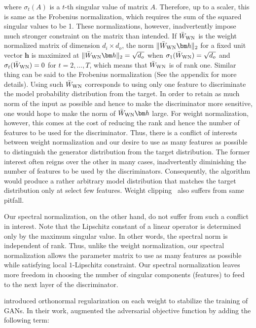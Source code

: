 where $\sigma_t(A)$ is a $t$-th singular value of matrix $A$. Therefore, up to a scaler, this is same as the Frobenius normalization, which requires the sum of the squared singular values to be 1. These normalizations, however, inadvertently impose much stronger constraint on the matrix than intended. If $\bar{W}_{\rm WN}$ is the weight normalized matrix of dimension $d_i \times d_o$, the norm $\|\bar{W}_{\rm WN}{\bm h}\|_2$ for a fixed unit vector ${\bm h}$ is maximized at $\| \bar{W}_{\rm WN} {\bm h} \|_2 =\sqrt{d_o}$ when $\sigma_1(\bar{W}_{\rm WN})=\sqrt{d_o}$ and $\sigma_t(\bar{W}_{\rm WN}) = 0$ for $t=2,\dots,T$, which means that  $\bar{W}_{\rm WN}$ is of rank one. Similar thing can be said to the Frobenius normalization (See the appendix for more details). Using such $\bar{W}_{\rm WN}$ corresponds to using only one feature to discriminate the model probability distribution from the target. In order to retain as much norm of the input as possible and hence to make the discriminator more sensitive, one would hope to make the norm of $\bar{W}_{\rm WN}{\bm h}$ large. For weight normalization, however, this comes at the cost of reducing the rank and hence the number of features to be used for the discriminator. Thus, there is a conflict of interests between weight normalization and our desire to use as many features as possible to distinguish the generator distribution from the target distribution. The former interest often reigns over the other in many cases, inadvertently diminishing the number of features to be used by the discriminators. Consequently, the algorithm would produce a rather arbitrary model distribution that matches the target distribution only at select few features. Weight clipping~\cite[]{arjovsky2017wasserstein} also suffers from same pitfall.

Our spectral normalization, on the other hand, do not suffer from such a conflict in interest. Note that the Lipschitz constant of a linear operator is determined only by the maximum singular value. In other words, the spectral norm is independent of rank. Thus, unlike the weight normalization, our spectral normalization allows the parameter matrix to use as many features as possible while satisfying local $1$-Lipschitz constraint. Our spectral normalization leaves more freedom in choosing the number of singular components (features) to feed to the next layer of the discriminator.

\cite{brock2016neural} introduced orthonormal regularization on each weight to stabilize the training of GANs. In their work, \cite{brock2016neural} augmented the adversarial objective function by adding the following term:

